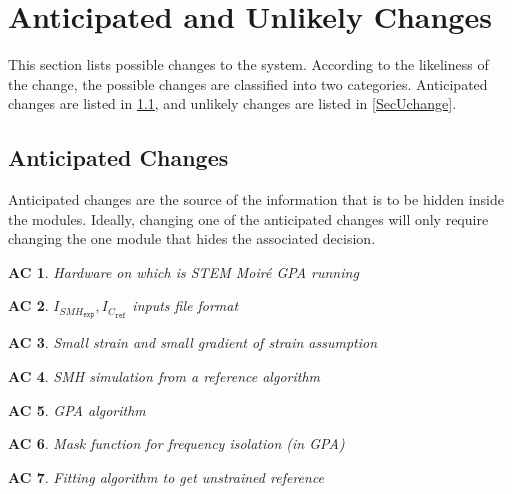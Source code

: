 \documentclass[12pt, titlepage]{article}
\newcommand{\progname}{STEM Moir{\'e} GPA}
\newtheorem{AC}{AC}
\begin{document}
\section{Anticipated and Unlikely Changes} \label{SecChange}

This section lists possible changes to the system. According to the likeliness
of the change, the possible changes are classified into two
categories. Anticipated changes are listed in \cref{SecAchange}, and
unlikely changes are listed in \cref{SecUchange}.

\subsection{Anticipated Changes} \label{SecAchange}

Anticipated changes are the source of the information that is to be hidden
inside the modules. Ideally, changing one of the anticipated changes will only
require changing the one module that hides the associated decision. 

\begin{AC}\normalfont Hardware on which is \progname{} running
\label{AC_Hardware}
\end{AC}

\begin{AC}\normalfont 
$I_{\mathit{SMH}_{\texttt{exp}}},I_{\mathit{C}_{\texttt{ref}}}$ inputs file 
format
\label{AC_FormatFile}
\end{AC}

\begin{AC}\normalfont Small strain and small gradient of strain assumption
\label{AC_Assum_SmallStrain}
\end{AC}

\begin{AC}\normalfont SMH simulation from a reference algorithm
\label{AC_SMH_algo}
\end{AC}

\begin{AC}\normalfont GPA algorithm
\label{AC_GPA_algo}
\end{AC}

\begin{AC}\normalfont Mask function for frequency isolation (in GPA)
\label{AC_Mask}
\end{AC}

\begin{AC}\normalfont Fitting algorithm to get unstrained reference 
\label{AC_RefFit}
\end{AC}
\end{document}

